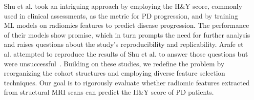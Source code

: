 Shu et al. took an intriguing approach by employing the H\&Y score, commonly used in clinical assessments, as the metric for PD progression, and by training ML models on radiomics features to 
predict disease progression. The performance of their models show promise, which in turn prompts the need for further analysis and raises questions about the study's reproducibility and replicability. 
Arafe et al. attempted to reproduce the results of Shu et al. to answer those questions but were unsuccessful~\cite{Arafe2023.05.05.539590}. Building on these studies, we redefine the problem 
by reorganizing the cohort structures and employing diverse feature selection techniques. Our goal is to rigorously evaluate whether radiomic features extracted from structural MRI scans can 
predict the H\&Y score of PD patients.